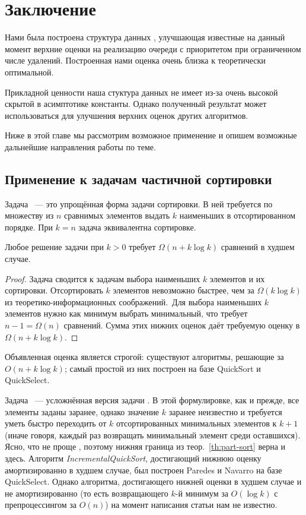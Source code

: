 \chapter{Заключение} \label{chapt3}

Нами была построена структура данных \CH, улучшающая известные на данный момент
верхние оценки на реализацию очереди с приоритетом при ограниченном
числе удалений. Построенная нами оценка очень близка к теоретически оптимальной.

Прикладной ценности наша стуктура данных не имеет из-за очень высокой скрытой
в асимптотике константы. Однако полученный результат может использоваться
для улучшения верхних оценок других алгоритмов.

Ниже в этой главе мы рассмотрим возможное применение \CH и опишем
возможные дальнейшие направления работы по теме.

\section{Применение к задачам частичной сортировки}

Задача \PartSort~--- это упрощённая форма задачи сортировки.\cite{partial-sort}
В ней требуется по множеству из $n$ сравнимых элементов выдать $k$ наименьших
в отсортированном порядке. При $k=n$ задача \PartSort эквивалентна сортировке.

\begin{theorem} \label{th:part-sort}
Любое решение задачи \PartSort при $k > 0$ требует $\Omega(n + k \log k)$ сравнений
в худшем случае.
\end{theorem}
\begin{proof}
Задача \PartSort сводится к задачам выбора наименьших $k$ элементов
и их сортировки. Отсортировать $k$ элементов невозможно быстрее,
чем за $\Omega(k \log k)$ из теоретико-информационных соображений\cite[с.~222]{Cormen}.\
Для выбора наименьших
$k$ элементов нужно как минимум выбрать минимальный, что
требует $n-1 = \Omega(n)$ сравнений. Сумма этих нижних оценок даёт требуемую
оценку в $\Omega(n+k\log k)$.
\end{proof}

Объявленная оценка является строгой: существуют алгоритмы, решающие
\PartSort за $O(n + k \log k)$; самый простой из них построен на базе
QuickSort и QuickSelect.

Задача \IncSort~--- усложнённая версия задачи \PartSort. В этой формулировке,
как и прежде, все элементы заданы заранее, однако значение $k$ заранее неизвестно
и требуется уметь быстро переходить от $k$ отсортированных минимальных элементов
к $k+1$ (иначе говоря, каждый раз возвращать минимальный элемент среди
оставшихся). Ясно, что \IncSort не проще \PartSort, поэтому нижняя
граница из теор.~\ref{th:part-sort} верна и здесь.
Алгоритм \emph{IncrementalQuickSort}\cite{opt-inc-sort},
достигающий нижнюю оценку амортизированно в худшем случае,
был построен Paredes и Navarro на базе QuickSelect.
Однако алгоритма, достигающего нижней оценки в худшем случае и не амортизированно
(то есть возвращающего $k$-й минимум за $O(\log k)$ с препроцессингом
за $O(n)$) на момент написания статьи нам не известно.

